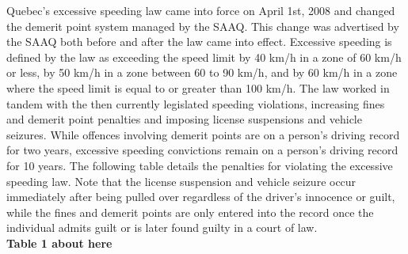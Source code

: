 Quebec’s excessive speeding law came into force on April 1st, 2008 and changed the demerit point system managed by the SAAQ. This change was advertised by the SAAQ both before and after the law came into effect. Excessive speeding is defined by the law as exceeding the speed limit by 40 km/h in a zone of 60 km/h or less, by 50 km/h in a zone between 60 to 90 km/h, and by 60 km/h in a zone where the speed limit is equal to or greater than 100 km/h. The law worked in tandem with the then currently legislated speeding violations, increasing fines and demerit point penalties and imposing license suspensions and vehicle seizures. While offences involving demerit points are on a person’s driving record for two years, excessive speeding convictions remain on a person’s driving record for 10 years. The following table details the penalties for violating the excessive speeding law. Note that the license suspension and vehicle seizure occur immediately after being pulled over regardless of the driver’s innocence or guilt, while the fines and demerit points are only entered into the record once the individual admits guilt or is later found guilty in a court of law. \\

\textbf{Table 1 about here} \\

